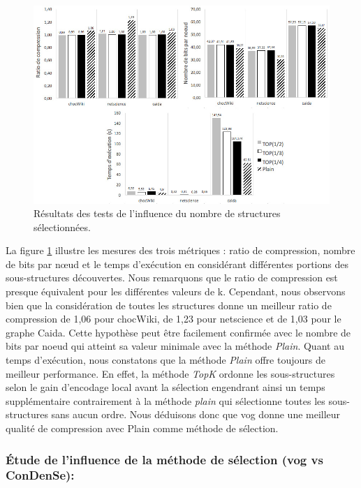 		
		\begin{figure}[H]
	
			
			\includegraphics[scale=0.6]{ressources/image/vogStat.jpg}
			
			\caption{Résultats des tests de l'influence du nombre de structures sélectionnées.}
			\label{fig:test-select}
	
	\end{figure}
	
	La figure \ref{fig:test-select} illustre les mesures des trois métriques : ratio de compression, nombre de bits par nœud et le temps d'exécution en considérant différentes portions des sous-structures découvertes. Nous remarquons que le ratio de compression est presque équivalent pour les différentes valeurs de k. Cependant, nous observons bien que la considération de toutes les structures donne un meilleur ratio de compression de 1,06 pour chocWiki, de 1,23 pour netscience et de 1,03 pour le graphe Caida. Cette hypothèse peut être facilement confirmée avec le nombre de bits par noeud qui atteint sa valeur minimale avec la méthode \textit{Plain}. Quant au temps d'exécution, nous constatons  que la méthode \textit{Plain} offre toujours de meilleur performance. En effet, la méthode \textit{TopK} ordonne les sous-structures selon le gain d'encodage local avant la sélection engendrant ainsi un temps supplémentaire contrairement à la méthode \textit{plain} qui sélectionne toutes les sous-structures sans aucun ordre. Nous déduisons donc que \gls{vog} donne une meilleur qualité de compression avec Plain comme méthode de sélection.
		
		\subsubsection{Étude de l'influence de la méthode de sélection (\gls{vog} vs \gls{ConDenSe}):}
		
